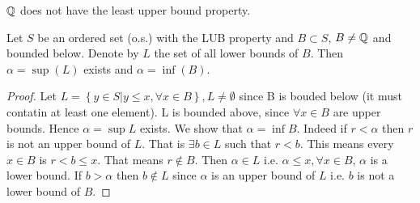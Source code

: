 \begin{example}
	\( \mathbb{Q} \) does not have the least upper bound property.
\end{example}

\begin{theorem}
	Let \( S \) be an ordered set (o.s.) with the LUB property and \( B \subset S \), 
	\( B \not = \mathbb{Q} \) and bounded below. Denote by \( L \) the set of all lower bounds of \(
	B \). Then \( \alpha = \sup(L) \) exists and \( \alpha = \inf(B) \).
	\label{Theorem1}
\end{theorem}

\begin{proof}
	Let \( L = \left\{ y \in S | y \le x, \forall x \in B \right\}, L \not = \emptyset \) since
	B is bouded below (it must contatin at least one element). L is bounded above, since \(
	\forall x \in B \) are upper bounds. 
	Hence \( \alpha = \sup L \) exists. 
	We show that \( \alpha = \inf B \). 
	Indeed if \( r < \alpha \) then \( r \) is not an upper bound of \( L \). 
	That is \( \exists b \in L \) such that \( r < b \). This means every \( x \in B \) is 
	\( r < b \le x \). That means \( r \not \in B \).
	Then \( \alpha \in L \) i.e. \( \alpha \le x, \forall x \in B  \), \( \alpha \) is a lower bound. 
	If \( b > \alpha \) then \( b \not \in L \) since \( \alpha \) is an upper bound of \( L
	\) i.e. \( b \) is not a lower bound of \( B \). 
\end{proof} 

